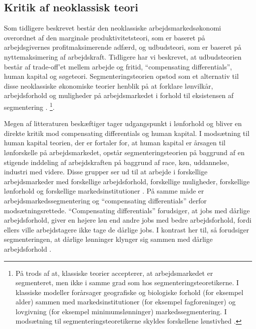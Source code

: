 \subsection{Kritik af neoklassisk teori}

Som tidligere beskrevet består den neoklassiske arbejdsmarkedsøkonomi overordnet af den marginale produktivitetsteori, som er baseret på arbejdsgivernes profitmaksimerende adfærd, og udbudsteori, som er baseret på nyttemaksimering af arbejdskraft. Tidligere har vi beskrevet, at udbudsteorien består af trade-off'et mellem arbejde og fritid, “compensating differentials”, human kapital og søgeteori. Segmenteringsteorien opstod som et alternativ til disse neoklassiske økonomiske teorier henblik på at forklare lønvilkår, arbejdsforhold og muligheder på arbejdsmarkedet i forhold til eksistensen af segmentering \parencite[69]{Doeringer1971} \parencite[95]{Leontaridi1998} \parencite[1216]{Cain1976} \parencite[359]{Reich1973} \parencite[1180]{Daw2012}. %
\footnote{På trods af at, klassiske teorier accepterer, at arbejdsmarkedet er segmenteret, men ikke i samme grad som hos segmenteringsteoretikerne. I klassiske modeller forårsager geografiske og biologiske forhold (for eksempel alder) sammen med markedsinstitutioner (for eksempel fagforeninger) og lovgivning (for eksempel minimumslønninger) markedssegmentering. I modsætning til segmenteringsteoretikerne skyldes forskellene lønstivhed \parencite[95]{Leontaridi1998}.}.

Megen af litteraturen beskæftiger tager udgangspunkt i lønforhold og bliver en direkte kritik mod compensating differentials og human kapital. I modsætning til human kapital teorien, der er fortaler for, at human kapital er årsagen til lønforskelle på arbejdsmarkedet, opstår segmenteringsteorien på baggrund af en stigende inddeling af arbejdskraften på baggrund af race, køn, uddannelse, industri med videre. Disse grupper ser ud til at arbejde i forskellige arbejdsmarkeder med forskellige arbejdsforhold, forskellige muligheder, forskellige lønforhold og forskellige markedsinstitutioner \parencite[359]{Reich1973}. På samme måde er arbejdsmarkedssegmentering og “compensating differentials” derfor modsætningsrettede. “Compensating differentials” forudsiger, at jobs med dårlige arbejdsforhold, giver en højere løn end andre jobs med bedre arbejdsforhold, fordi ellers ville arbejdstagere ikke tage de dårlige jobs. I kontrast her til, så forudsiger segmenteringen, at dårlige lønninger klynger sig sammen med dårlige arbejdsforhold \parencite[1180]{Daw2012}.


